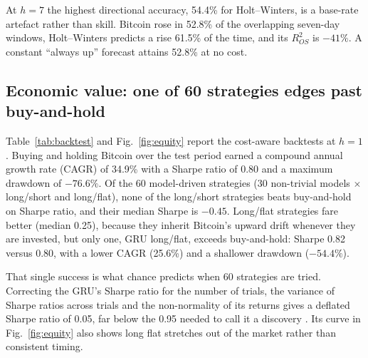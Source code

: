 At $h=7$ the highest directional accuracy, 54.4\% for Holt--Winters, is a base-rate artefact rather than skill. Bitcoin rose in 52.8\% of the overlapping seven-day windows, Holt--Winters predicts a rise 61.5\% of the time, and its $R^2_{OS}$ is $-41\%$. A constant ``always up'' forecast attains 52.8\% at no cost.

\subsection{Economic value: one of 60 strategies edges past buy-and-hold}
Table~\ref{tab:backtest} and Fig.~\ref{fig:equity} report the cost-aware backtests at $h=1$. Buying and holding Bitcoin over the test period earned a compound annual growth rate (CAGR) of 34.9\% with a Sharpe ratio of 0.80 and a maximum drawdown of $-76.6\%$. Of the 60 model-driven strategies (30 non-trivial models $\times$ long/short and long/flat), none of the long/short strategies beats buy-and-hold on Sharpe ratio, and their median Sharpe is $-0.45$. Long/flat strategies fare better (median 0.25), because they inherit Bitcoin's upward drift whenever they are invested, but only one, GRU long/flat, exceeds buy-and-hold: Sharpe 0.82 versus 0.80, with a lower CAGR (25.6\%) and a shallower drawdown ($-54.4\%$).

That single success is what chance predicts when 60 strategies are tried. Correcting the GRU's Sharpe ratio for the number of trials, the variance of Sharpe ratios across trials and the non-normality of its returns gives a deflated Sharpe ratio of 0.05, far below the 0.95 needed to call it a discovery \cite{bailey2014}. Its curve in Fig.~\ref{fig:equity} also shows long flat stretches out of the market rather than consistent timing.
